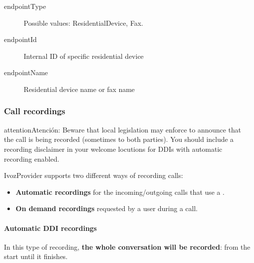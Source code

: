 \documentclass[letterpaper,10pt,spanish]{sphinxmanual}
\begin{document}
\begin{description}
\item[{endpointType}] \leavevmode{}\label{administration_portal/client/residential/calls/call_csv_schedulers:term-endpointtype}
Possible values: ResidentialDevice, Fax.

\item[{endpointId}] \leavevmode{}\label{administration_portal/client/residential/calls/call_csv_schedulers:term-endpointid}
Internal ID of specific residential device

\item[{endpointName}] \leavevmode{}\label{administration_portal/client/residential/calls/call_csv_schedulers:term-endpointname}
Residential device name or fax name

\end{description}


\subsubsection{Call recordings}
\label{administration_portal/client/residential/calls/call_recordings::doc}\label{administration_portal/client/residential/calls/call_recordings:call-recordings}\label{administration_portal/client/residential/calls/call_recordings:id1}
\begin{notice}{attention}{Atención:}
Beware that local legislation may enforce to announce that the
call is being recorded (sometimes to both parties). You should include
a recording disclaimer in your welcome locutions for DDIs with automatic
recording enabled.
\end{notice}

IvozProvider supports two different ways of recording calls:
\begin{itemize}
\item {} 
\textbf{Automatic recordings} for the incoming/outgoing calls that use a
{\hyperref[administration_portal/client/vpbx/ddis:ddis]{}}.

\item {} 
\textbf{On demand recordings} requested by a user during a call.

\end{itemize}


\paragraph{Automatic DDI recordings}
\label{administration_portal/client/residential/calls/call_recordings:automatic-ddi-recordings}
In this type of recording, \textbf{the whole conversation will be recorded}: from
the start until it finishes.
\end{document}
